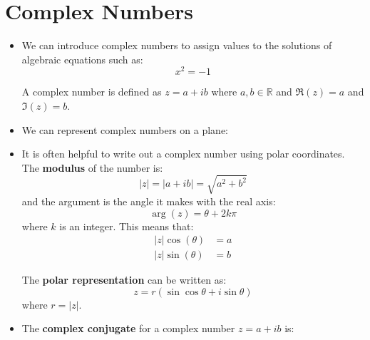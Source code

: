 \section{Complex Numbers}
\begin{itemize}
    \item We can introduce complex numbers to assign values to the solutions of algebraic equations such as:
    \begin{equation}
        x^2 = -1
        \label{eq:}
    \end{equation}
    \begin{definition}
        A complex number is defined as $z=a+ib$ where $a,b\in \mathbb{R}$ and $\Re(z)=a$ and $\Im(z)=b$.
    \end{definition}
    \item We can represent complex numbers on a plane:
    \begin{center}
    \end{center}
    \item It is often helpful to write out a complex number using polar coordinates. The \textbf{modulus} of the number is:
    \begin{equation}
        |z| = |a+ib| = \sqrt{a^2+b^2}
        \label{eq:}
    \end{equation}
    and the argument is the angle it makes with the real axis:
    \begin{equation}
        \arg(z) = \theta + 2k\pi
        \label{eq:}
    \end{equation}
    where $k$ is an integer. This means that:
    \begin{align*}
        |z|\cos(\theta) &= a \\
        |z|\sin(\theta) &= b
    \end{align*}
    \begin{idea}
        The \textbf{polar representation} can be written as:
        \begin{equation}
            z = r\left(\sin\cos\theta + i\sin\theta\right)
            \label{eq:}
        \end{equation}
        where $r=|z|$.
    \end{idea}
    \item The \textbf{complex conjugate} for a complex number $z=a+ib$ is:

\end{itemize}
